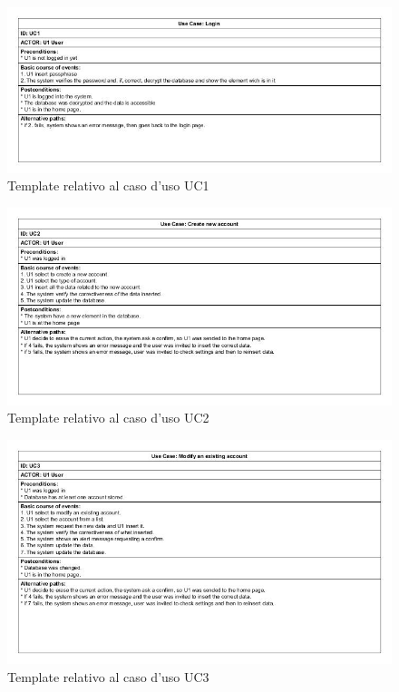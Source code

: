 \documentclass[a4paper,10pt]{report} %
\begin{document}
		\begin{figure}[htbp]
			\centering
			\includegraphics[width = \textwidth]{immagini/USE_CASE_TEMPLATE/UC01.jpg}
			\caption{Template relativo al caso d'uso UC1}
			\end{figure}
		\begin{figure}[htbp]
			\centering
			\includegraphics[width = \textwidth]{immagini/USE_CASE_TEMPLATE/UC02.jpg}
			\caption{Template relativo al caso d'uso UC2}
			\end{figure}
		\begin{figure}[htbp]
			\centering
			\includegraphics[width = \textwidth]{immagini/USE_CASE_TEMPLATE/UC03.jpg}
			\caption{Template relativo al caso d'uso UC3}
			\end{figure}
\end{document}
